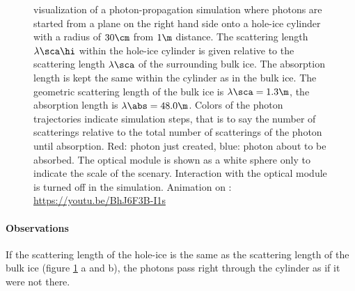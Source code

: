 \begin{figure}[htbp]
  \hfill
  \hfill
  \hfill
  \hfill
  \hfill
  \hfill
  \hfill
  \hfill
  \caption{ visualization of a photon-propagation simulation where photons are started from a plane on the right hand side onto a hole-ice cylinder with a radius of $30\cm$ from $1\m$ distance. The scattering length $\lambda\sca\hi$ within the hole-ice cylinder is given relative to the scattering length $\lambda\sca$ of the surrounding bulk ice. The absorption length is kept the same within the cylinder as in the bulk ice. The geometric scattering length of the bulk ice is $\lambda\sca = 1.3\m$, the absorption length is $\lambda\abs = 48.0\m$. Colors of the photon trajectories indicate simulation steps, that is to say the number of scatterings relative to the total number of scatterings of the photon until absorption. Red: photon just created, blue: photon about to be absorbed. The optical module is shown as a white sphere only to indicate the scale of the scenary. Interaction with the optical module is turned off in the simulation. Animation on : \protect\url{https://youtu.be/BhJ6F3B-I1s}}
  \label{fig:Uo8kuo2z}
\end{figure}

\paragraph{Observations}
If the scattering length of the hole-ice is the same as the scattering length of the bulk ice (figure \ref{fig:Uo8kuo2z} a and b), the photons pass right through the cylinder as if it were not there.

